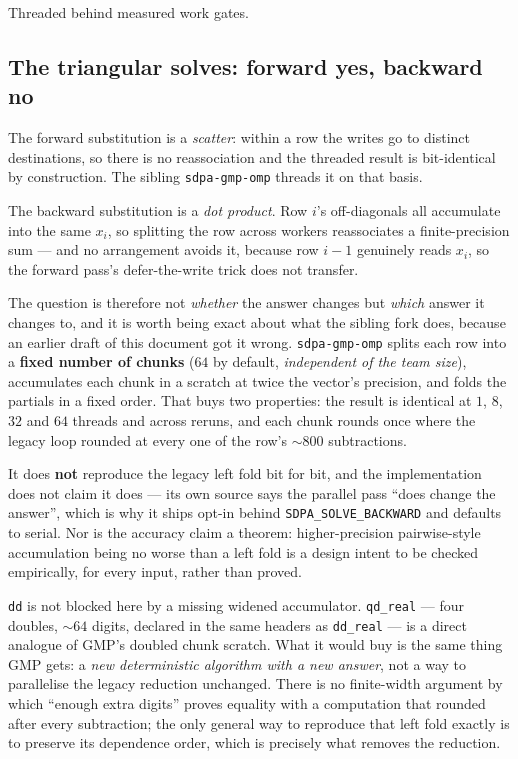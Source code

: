 \documentclass[11pt]{article}
\newcommand{\code}[1]{\texttt{#1}}
\begin{document}
Threaded behind measured work gates.

\subsection{The triangular solves: forward yes, backward no}

The forward substitution is a \emph{scatter}: within a row the writes go to distinct destinations,
so there is no reassociation and the threaded result is bit-identical by construction. The sibling
\code{sdpa-gmp-omp} threads it on that basis.

The backward substitution is a \emph{dot product}. Row $i$'s off-diagonals all accumulate into the
same $x_i$, so splitting the row across workers reassociates a finite-precision sum --- and no
arrangement avoids it, because row $i-1$ genuinely reads $x_i$, so the forward pass's
defer-the-write trick does not transfer.

The question is therefore not \emph{whether} the answer changes but \emph{which} answer it changes
to, and it is worth being exact about what the sibling fork does, because an earlier draft of this
document got it wrong. \code{sdpa-gmp-omp} splits each row into a \textbf{fixed number of chunks}
($64$ by default, \emph{independent of the team size}), accumulates each chunk in a scratch at
twice the vector's precision, and folds the partials in a fixed order. That buys two properties:
the result is identical at $1$, $8$, $32$ and $64$ threads and across reruns, and each chunk rounds
once where the legacy loop rounded at every one of the row's $\sim$$800$ subtractions.

It does \textbf{not} reproduce the legacy left fold bit for bit, and the implementation does not
claim it does --- its own source says the parallel pass ``does change the answer'', which is why
it ships opt-in behind \code{SDPA\_SOLVE\_BACKWARD} and defaults to serial. Nor is the accuracy
claim a theorem: higher-precision pairwise-style accumulation being no worse than a left fold is a
design intent to be checked empirically, for every input, rather than proved.

\code{dd} is not blocked here by a missing widened accumulator. \code{qd\_real} --- four doubles,
$\sim$$64$ digits, declared in the same headers as \code{dd\_real} --- is a direct analogue of
GMP's doubled chunk scratch. What it would buy is the same thing GMP gets: a \emph{new
deterministic algorithm with a new answer}, not a way to parallelise the legacy reduction
unchanged. There is no finite-width argument by which ``enough extra digits'' proves equality with
a computation that rounded after every subtraction; the only general way to reproduce that left
fold exactly is to preserve its dependence order, which is precisely what removes the reduction.
\end{document}
